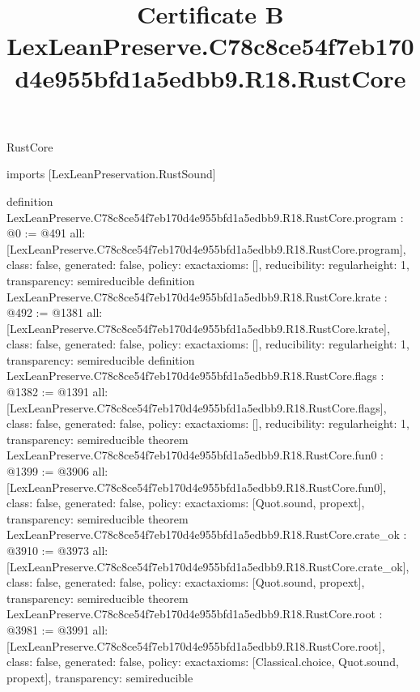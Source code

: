 \begin{lexlean}{RustCore}
\title{Certificate B LexLeanPreserve.C78c8ce54f7eb170d4e955bfd1a5edbb9.R18.RustCore}
\begin{coremodule}
imports [LexLeanPreservation.RustSound]

definition LexLeanPreserve.C78c8ce54f7eb170d4e955bfd1a5edbb9.R18.RustCore.program : @0 := @491 {
  all: [LexLeanPreserve.C78c8ce54f7eb170d4e955bfd1a5edbb9.R18.RustCore.program],
  class: false,
  generated: false,
  policy: exact{axioms: []},
  reducibility: regular{height: 1},
  transparency: semireducible
}
definition LexLeanPreserve.C78c8ce54f7eb170d4e955bfd1a5edbb9.R18.RustCore.krate : @492 := @1381 {
  all: [LexLeanPreserve.C78c8ce54f7eb170d4e955bfd1a5edbb9.R18.RustCore.krate],
  class: false,
  generated: false,
  policy: exact{axioms: []},
  reducibility: regular{height: 1},
  transparency: semireducible
}
definition LexLeanPreserve.C78c8ce54f7eb170d4e955bfd1a5edbb9.R18.RustCore.flags : @1382 := @1391 {
  all: [LexLeanPreserve.C78c8ce54f7eb170d4e955bfd1a5edbb9.R18.RustCore.flags],
  class: false,
  generated: false,
  policy: exact{axioms: []},
  reducibility: regular{height: 1},
  transparency: semireducible
}
theorem LexLeanPreserve.C78c8ce54f7eb170d4e955bfd1a5edbb9.R18.RustCore.fun0 : @1399 := @3906 {
  all: [LexLeanPreserve.C78c8ce54f7eb170d4e955bfd1a5edbb9.R18.RustCore.fun0],
  class: false,
  generated: false,
  policy: exact{axioms: [Quot.sound, propext]},
  transparency: semireducible
}
theorem LexLeanPreserve.C78c8ce54f7eb170d4e955bfd1a5edbb9.R18.RustCore.crate_ok : @3910 := @3973 {
  all: [LexLeanPreserve.C78c8ce54f7eb170d4e955bfd1a5edbb9.R18.RustCore.crate_ok],
  class: false,
  generated: false,
  policy: exact{axioms: [Quot.sound, propext]},
  transparency: semireducible
}
theorem LexLeanPreserve.C78c8ce54f7eb170d4e955bfd1a5edbb9.R18.RustCore.root : @3981 := @3991 {
  all: [LexLeanPreserve.C78c8ce54f7eb170d4e955bfd1a5edbb9.R18.RustCore.root],
  class: false,
  generated: false,
  policy: exact{axioms: [Classical.choice, Quot.sound, propext]},
  transparency: semireducible
}


\end{coremodule}
\end{lexlean}

